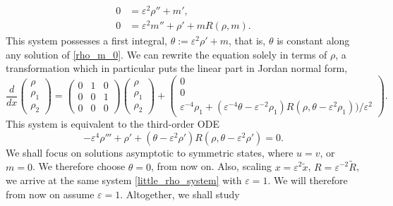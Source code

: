 \documentclass[10pt]{article}
\newcommand{\eps}{\varepsilon}
\begin{document}
\begin{equation}
\begin{aligned}
0&= \varepsilon^2 \rho'' + m',\\
0 &= \varepsilon^2 m'' + \rho' +mR(\rho,m).
\end{aligned}
\label{rho_m_0}
\end{equation}
This system possesses a first integral, $\theta :=\varepsilon^2 \rho' + m$, that is, $\theta$ is constant along any solution of \eqref{rho_m_0}.
We can rewrite the equation solely in terms of $\rho$, a transformation which in particular puts the  linear part in Jordan normal form,
\begin{equation}
\frac{d}{dx}\begin{pmatrix} \rho \\ \rho_1 \\ \rho_2 \end{pmatrix} =  \begin{pmatrix} 0 & 1 & 0\\ 0 & 0 & 1\\ 0 & 0 & 0 \end{pmatrix} \begin{pmatrix}\rho \\ \rho_1 \\ \rho_2  \end{pmatrix} + \begin{pmatrix} 0 \\0\\ \eps^{-4}\rho_1 + (\eps^{-4}\theta-\eps^{-2}\rho_1) R(\rho,\theta-\varepsilon^2\rho_1))/\varepsilon^2\end{pmatrix}.
\label{rho_system}
\end{equation}
This system is equivalent to the third-order ODE 
\begin{equation}
-\eps^4\rho'''+ \rho'+(\theta-\eps^2\rho')R(\rho,\theta-\varepsilon^2\rho')=0.
\label{little_rho_system}
\end{equation}
We shall focus on solutions asymptotic to symmetric states, where $u=v$, or $m=0$. We therefore choose $\theta=0$, from now on. Also, scaling $x=\eps^2\tilde{x}$, $R=\eps^{-2}\tilde{R}$, we arrive at the same system \eqref{little_rho_system} with $\eps=1$. We will therefore from now on assume $\eps=1$. Altogether, we shall study 
\end{document}
